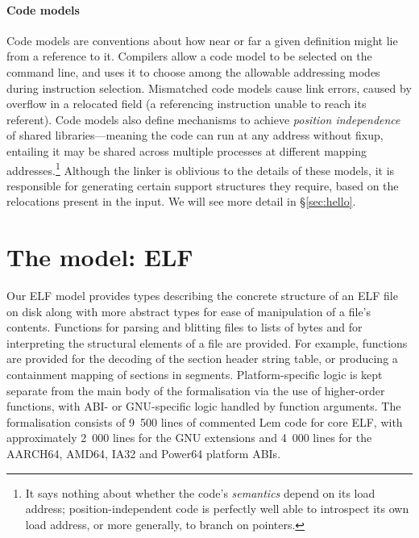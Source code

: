 \documentclass[preprint,10pt]{sigplanconf-pldi16}
\newcommand{\mynote}[2]{}
\newcommand{\ps}[1]{\mynote{PS}{#1}}
\begin{document}
\paragraph{Code models}\label{sec:code-models} Code models are conventions about 
how near or far a given definition might lie from a reference to it.
Compilers allow a code model to be selected on the command line, and uses it to choose among the allowable addressing modes during instruction selection.
Mismatched code models cause link errors, caused by overflow in a relocated field 
(a referencing instruction unable to reach its referent).
Code models also define mechanisms to achieve \emph{position independence} of shared libraries---meaning
the code can run at any address without fixup,
entailing it may be shared across multiple processes at different mapping addresses.\footnote{It says nothing about
whether the code's \emph{semantics} depend on its load address; 
position-independent code is perfectly well able to 
introspect its own load address, or more generally, to branch on pointers.}
Although the linker is oblivious to the details of these models, 
it is responsible for generating certain support structures they require,
based on the relocations present in the input.
We will see more detail in \S\ref{sec:hello}.

\ps{somewhere we should describe the linkers in widespread use and
  their current status?}

\section{The model: ELF}
\label{sect.elf.formalisation}

Our ELF model provides types describing the concrete structure of an ELF file on disk along with more abstract types for ease of manipulation of a file's contents.
Functions for parsing and blitting files to lists of bytes and for interpreting the structural elements of a file are provided.
For example, functions are provided for the decoding of the section header string table, or producing a containment mapping of sections in segments.
Platform-specific logic is kept separate from the main body of the formalisation via the use of higher-order functions, with ABI- or GNU-specific logic handled by function arguments.
The formalisation consists of 9~500 lines of commented Lem code for core ELF, with approximately 2~000 lines for the GNU extensions and 4~000 lines for the AARCH64, AMD64, IA32 and Power64 platform ABIs.
\end{document}
